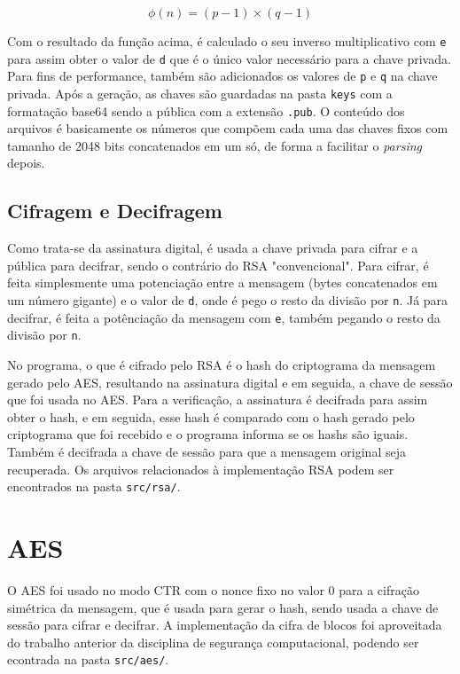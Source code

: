 \documentclass[12pt]{article}
\begin{document}
\[
    \phi(n) = (p-1) \times (q-1)
\]

Com o resultado da função acima, é calculado o seu inverso multiplicativo com \texttt{e} para assim obter o valor de \texttt{d} que é o único valor necessário para a chave privada. Para fins de performance, também são adicionados os valores de \texttt{p} e \texttt{q} na chave privada. Após a geração, as chaves são guardadas na pasta \texttt{keys} com a formatação base64 sendo a pública com a extensão \texttt{.pub}. O conteúdo dos arquivos é basicamente os números que compõem cada uma das chaves fixos com tamanho de 2048 bits concatenados em um só, de forma a facilitar o \textit{parsing} depois.

\subsection{Cifragem e Decifragem}

Como trata-se da assinatura digital, é usada a chave privada para cifrar e a pública para decifrar, sendo o contrário do RSA "convencional". Para cifrar, é feita simplesmente uma potenciação entre a mensagem (bytes concatenados em um número gigante) e o valor de \texttt{d}, onde é pego o resto da divisão por \texttt{n}. Já para decifrar, é feita a potênciação da mensagem com \texttt{e}, também pegando o resto da divisão por \texttt{n}.

No programa, o que é cifrado pelo RSA é o hash do criptograma da mensagem gerado pelo AES, resultando na assinatura digital e em seguida, a chave de sessão que foi usada no AES. Para a verificação, a assinatura é decifrada para assim obter o hash, e em seguida, esse hash é comparado com o hash gerado pelo criptograma que foi recebido e o programa informa se os hashs são iguais. Também é decifrada a chave de sessão para que a mensagem original seja recuperada. Os arquivos relacionados à implementação RSA podem ser encontrados na pasta \texttt{src/rsa/}.

\section{AES}

O AES foi usado no modo CTR com o nonce fixo no valor 0 para a cifração simétrica da mensagem, que é usada para gerar o hash, sendo usada a chave de sessão para cifrar e decifrar. A implementação da cifra de blocos foi aproveitada do trabalho anterior da disciplina de segurança computacional, podendo ser econtrada na pasta \texttt{src/aes/}.
\end{document}
